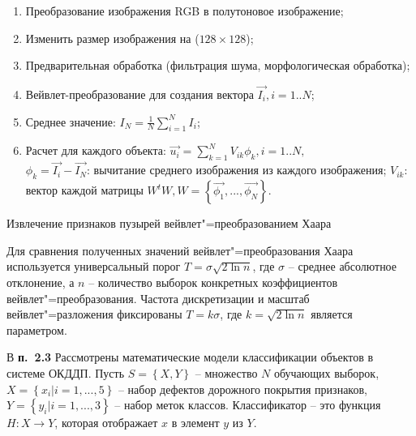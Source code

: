 \begin{algorithm}[ht!]
  \begin{enumerate}[label=\textbf{Шаг~\arabic*.},leftmargin=4em,ref=\arabic*]
  \item Преобразование изображения RGB в полутоновое изображение;
  \item Изменить размер изображения на ($128 \times 128$);
  \item Предварительная обработка (фильтрация шума, морфологическая обработка);
  \item Вейвлет-преобразование для создания вектора $\vec{I_i}, i=1..N$;
  \item Среднее значение: $I_N=\frac{1}{N}\sum_{i=1}^N I_i$;
  \item Расчет для каждого объекта: $\vec{u_i}=\sum_{k=1}^N V_{ik} \phi_k, i=1..N,$\\
		$\phi_k=\vec{I_i}-\vec{I_N}$: вычитание среднего изображения из каждого изображения;
			$V_{ik}$: вектор каждой матрицы $W^tW, W=\left\{\vec{\phi_1},...,\vec{\phi_N}\right\}.$
  \end{enumerate}
  \caption{Извлечение признаков пузырей вейвлет"=преобразованием Хаара}\label{alg5}
\end{algorithm}

Для сравнения полученных значений вейвлет"=преобразования Хаара используется универсальный порог $ T = \sigma \sqrt {2 \ln n} $, где $ \sigma $ -- среднее абсолютное отклонение, а $ n $ -- количество выборок конкретных коэффициентов вейвлет"=преобразования. Частота дискретизации и масштаб вейвлет"=разложения фиксированы $ T = k \sigma $, где $ k = \sqrt {2 \ln n} $ является параметром.

В \textbf{п.~2.3} Рассмотрены математические модели классификации объектов в системе ОКДДП. Пусть  $S=\left\{X, Y\right\}$ -- множество $N$ обучающих выборок, $X=\left\{x_i | i = 1, ..., 5\right\}$ --  набор дефектов дорожного покрытия признаков, $Y = \left\{y_i |i = 1, ..., 3\right\}$ -- набор меток классов. Классификатор -- это функция $H: X \rightarrow Y$, которая отображает $x$ в элемент $y$ из $Y$.

